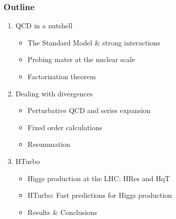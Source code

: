 \documentclass[aspectratio=43]{beamer}
\begin{document}
\begin{frame}

	\frametitle{Outline}
	
	\begin{enumerate}
		\item {\color{blue}QCD in a nutshell}
		\begin{itemize}
			\item The Standard Model $\&$ strong interactions
			\item Probing mater at the nuclear scale
			\item Factorization theorem
		\end{itemize}
		\item {\color{blue}Dealing with divergences}
		\begin{itemize}
			\item Perturbative QCD and series expansion
			\item Fixed order calculations
			\item Resummation
		\end{itemize}
		\item {\color{blue}HTurbo}
		\begin{itemize}
			\item Higgs production at the LHC: HRes and HqT
			\item HTurbo: Fast predictions for Higgs production
			\item Results $\&$ Conclusions
		\end{itemize}
	\end{enumerate}
	
\end{frame}

\begin{frame}


\end{frame}
\end{document}
